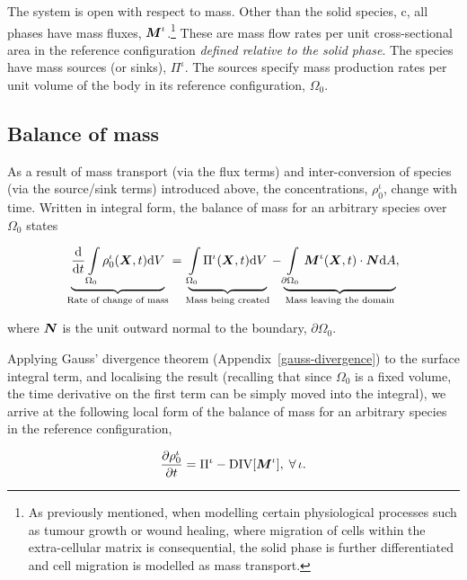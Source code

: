The system is open with respect to mass. Other than the solid species,
$\mathrm{c}$, all phases have mass fluxes, $\mbox{\boldmath$ M$}^\iota$.\footnote{As
  previously mentioned, when modelling certain physiological processes
  such as tumour growth or wound healing, where migration of cells
  within the extra-cellular matrix is consequential, the solid phase
  is further differentiated and cell migration is modelled as mass
  transport.}  These are mass flow rates per unit cross-sectional area
in the reference configuration \emph{defined relative to the solid
  phase}. The species have mass sources (or sinks), $\Pi^\iota$. The
sources specify mass production rates per unit volume of the body in
its reference configuration, $\Omega_0$.

\subsection{Balance of mass}
\label{balance-of-mass}

As a result of mass transport (via the flux terms) and
inter-conversion of species (via the source/sink terms) introduced
above, the concentrations, $\rho_0^\iota$, change with
time. Written in integral form, the balance of mass for an arbitrary
species over $\Omega_0$ states

\begin{equation}
\underbrace{\frac{\mathrm{d}}{\mathrm{d}t} \int\limits_{\Omega_0} \rho_0^\iota
(\mbox{\boldmath$ X$},t)\mathrm{d}V}_{\text{Rate of change of mass}} =
\underbrace{\int\limits_{\Omega_0} \Pi^\iota
  (\mbox{\boldmath$ X$},t)\mathrm{d}V}_{\text{Mass being created}}
-\underbrace{\int\limits_{\partial\Omega_0}\mbox{\boldmath$ M$}^\iota(\mbox{\boldmath$ X$},t)\cdot\mbox{\boldmath$ N$}
  \mathrm{d}A}_{\text{Mass leaving the domain}}, 
\label{globalbalanceofmass}
\end{equation}

\noindent where $\mbox{\boldmath$ N$}$ is the unit outward normal to the boundary,
$\partial\Omega_0$.

 Applying Gauss' divergence theorem
(Appendix~\ref{gauss-divergence}) to the surface integral term, and
localising the result (recalling that since $\Omega_0$ is a fixed
volume, the time derivative on the first term can be simply moved into
the integral), we arrive at the following local form of the balance of
mass for an arbitrary species in the reference configuration,

\begin{equation}
\frac{\partial\rho_0^\iota}{\partial t} = \Pi^\iota -
\mathrm{\small{DIV}}[\mbox{\boldmath$ M$}^\iota],\;\forall\,\iota.
\label{localbalanceofmass}
\end{equation}

